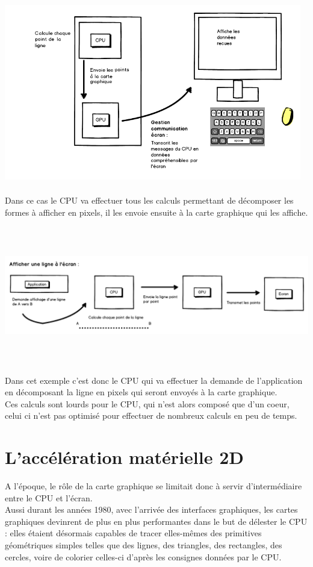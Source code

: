 \begin{center}
\includegraphics[width=13cm,height=8cm]{img/cpuRaster.png}

Dans ce cas le CPU va effectuer tous les calculs permettant de décomposer les formes à afficher en pixels, il les envoie ensuite à la carte graphique qui les affiche.


\includegraphics[width=15cm,height=6cm]{img/cpuRasterExemple.png}

Dans cet exemple c'est donc le CPU qui va effectuer la demande de l'application en décomposant la ligne en pixels qui seront envoyés à la carte graphique.\\
Ces calculs sont lourds pour le CPU, qui n'est alors composé que d'un coeur, celui ci n'est pas optimisé pour effectuer de nombreux calculs en peu de temps.

\end{center}
\newpage

\section{L'accélération matérielle 2D}

A l'époque, le rôle de la carte graphique se limitait donc à servir d'intermédiaire entre le CPU et l'écran.
\\
Aussi durant les années 1980, avec l'arrivée des interfaces graphiques, les cartes graphiques devinrent de plus en plus performantes dans le but de délester le CPU : elles étaient désormais capables de tracer elles-mêmes des primitives géométriques simples telles que des lignes, des triangles, des rectangles, des cercles, voire de colorier celles-ci d'après les consignes données par le CPU.\\

